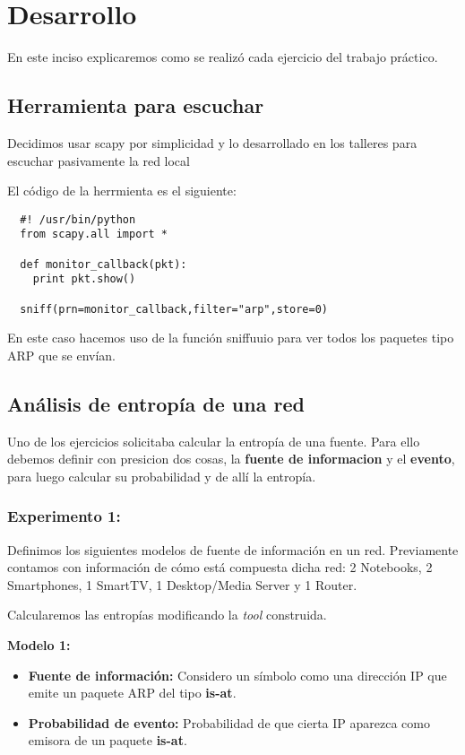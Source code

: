 \section{Desarrollo}
En este inciso explicaremos como se realizó cada ejercicio del trabajo práctico.

\subsection{Herramienta para escuchar}
Decidimos usar scapy por simplicidad y lo desarrollado en los talleres para escuchar pasivamente la red local

El código de la herrmienta es el siguiente:

\begin{center}
 \begin{verbatim}
  #! /usr/bin/python
  from scapy.all import *

  def monitor_callback(pkt):
    print pkt.show()

  sniff(prn=monitor_callback,filter="arp",store=0)
 \end{verbatim}

\end{center}

En este caso hacemos uso de la función sniffuuio para ver todos los paquetes tipo ARP que se envían.

\subsection{Análisis de entropía de una red}
Uno de los ejercicios solicitaba calcular la entropía de una fuente.
Para ello debemos definir con presicion dos cosas, la \textbf{fuente de informacion} y el \textbf{evento}, para luego calcular su probabilidad
y de allí la entropía.

\subsubsection{Experimento 1:}

Definimos los siguientes modelos de fuente de información en un red. Previamente contamos con información de cómo está compuesta dicha red: 2 Notebooks, 2 Smartphones, 1 SmartTV, 1 Desktop/Media Server y 1 Router.

Calcularemos las entropías modificando la \textit{tool} construida. 

\textbf{Modelo 1:}
\begin{itemize}
\item \textbf{Fuente de información:} Considero un símbolo como una dirección IP que emite un paquete ARP del tipo \textbf{is-at}.
\item \textbf{Probabilidad de evento:} Probabilidad de que cierta IP aparezca como emisora de un paquete \textbf{is-at}.
\end{itemize}

